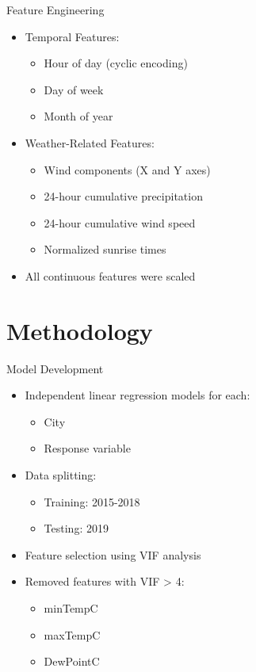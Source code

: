 \documentclass[svgnames, 10pt]{beamer}
\begin{document}
\begin{frame}{Feature Engineering}
\begin{itemize}
    \item Temporal Features:
        \begin{itemize}
            \item Hour of day (cyclic encoding)
            \item Day of week
            \item Month of year
        \end{itemize}
    \item Weather-Related Features:
        \begin{itemize}
            \item Wind components (X and Y axes)
            \item 24-hour cumulative precipitation
            \item 24-hour cumulative wind speed
            \item Normalized sunrise times
        \end{itemize}
    \item All continuous features were scaled
\end{itemize}
\end{frame}

\section{Methodology}

\begin{frame}{Model Development}
\begin{itemize}
    \item Independent linear regression models for each:
        \begin{itemize}
            \item City
            \item Response variable
        \end{itemize}
    \item Data splitting:
        \begin{itemize}
            \item Training: 2015-2018
            \item Testing: 2019
        \end{itemize}
    \item Feature selection using VIF analysis
    \item Removed features with VIF > 4:
        \begin{itemize}
            \item minTempC
            \item maxTempC
            \item DewPointC
        \end{itemize}
\end{itemize}
\end{frame}
\end{document}
